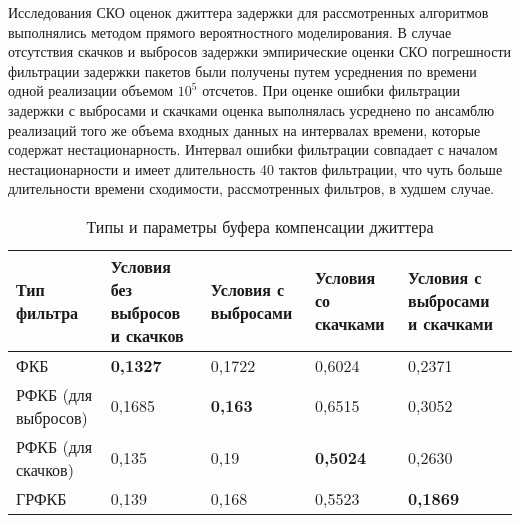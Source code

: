 

Исследования СКО оценок джиттера задержки для рассмотренных алгоритмов выполнялись методом прямого вероятностного моделирования.
В случае отсутствия скачков и выбросов задержки эмпирические оценки СКО погрешности фильтрации задержки пакетов были получены путем усреднения по времени одной реализации объемом $10^5$ отсчетов.
При оценке ошибки фильтрации задержки с выбросами и скачками оценка выполнялась усреднено по ансамблю реализаций того же объема входных данных на интервалах времени, которые содержат нестационарность.
Интервал ошибки фильтрации совпадает с началом нестационарности и имеет длительность 40 тактов фильтрации, что чуть больше длительности времени сходимости, рассмотренных фильтров, в худшем случае.


\begin{table} [!h]
  \centering
  \parbox{15cm}{\caption{Типы и параметры буфера компенсации джиттера}\label{fkDiffSit}}
\begin{tabular}{|p{3cm}|p{3cm}|p{3cm}|p{3cm}|p{3cm}|}
    \hline
    Тип фильтра        & Условия без выбросов и скачков & Условия с выбросами & Условия со скачками  & Условия с выбросами и скачками \\ \hline
    ФКБ                 & \textbf{0,1327}                 & 0,1722                   & 0,6024                 & 0,2371                           \\ \hline
    РФКБ (для выбросов) & 0,1685                          &  \textbf{0,163}       & 0,6515                 & 0,3052                           \\ \hline
    РФКБ (для скачков)   & 0,135                           & 0,19               & \textbf{0,5024}                & 0,2630                             \\ \hline
    ГРФКБ               & 0,139                          & 0,168               &   0,5523            & \textbf{0,1869}                           \\ \hline
    \end{tabular}
\end{table}









